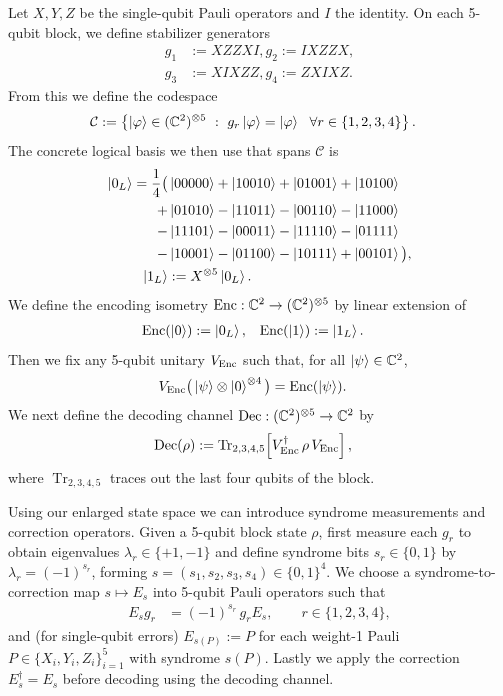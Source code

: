 Let $X,Y,Z$ be the single-qubit Pauli operators and $I$ the identity.
On each 5-qubit block, we define stabilizer generators
\begin{align}
g_1 &:= XZZXI, g_2 := IXZZX, \nonumber \\
g_3 &:= XIXZZ, g_4 := ZXIXZ.
\end{align}
From this we define the codespace
\begin{align}
\mathcal{C}
&:= \left\{\ket{\varphi}\in(\mathbb{C}^2)^{\otimes 5} ~:~ g_r\ket{\varphi}=\ket{\varphi}\ \ \forall r\in\{1,2,3,4\}\right\}.
\end{align}
The concrete logical basis we then use that spans $\mathcal{C}$ is
\begin{align}
\ket{0_L} = \frac{1}{4}\big(&\ket{00000}+\ket{10010}+\ket{01001}+\ket{10100} \nonumber \\
+&\ket{01010} -\ket{11011}-\ket{00110}-\ket{11000} \nonumber \\
-&\ket{11101}-\ket{00011}-\ket{11110}-\ket{01111} \nonumber \\
-&\ket{10001} -\ket{01100}-\ket{10111}+\ket{00101}\big),
\\
\ket{1_L}
&:= X^{\otimes 5}\ket{0_L}.
\end{align}
We define the encoding isometry $\operatorname{Enc}:\mathbb{C}^2\to(\mathbb{C}^2)^{\otimes 5}$ by linear extension of
\begin{align}
\operatorname{Enc}(\ket{0}) &:= \ket{0_L}, &
\operatorname{Enc}(\ket{1}) &:= \ket{1_L}.
\end{align}
Then we fix any 5-qubit unitary $V_{\operatorname{Enc}}$ such that, for all $\ket{\psi}\in\mathbb{C}^2$,
\begin{align}
V_{\operatorname{Enc}}\big(\ket{\psi}\otimes\ket{0}^{\otimes 4}\big)
&= \operatorname{Enc}(\ket{\psi}).
\end{align}
We next define the decoding channel $\operatorname{Dec}:(\mathbb{C}^2)^{\otimes 5}\to\mathbb{C}^2$ by
\begin{align}
\operatorname{Dec}(\rho)
&:= \operatorname{Tr}_{2,3,4,5}\!\left[V_{\operatorname{Enc}}^\dagger\,\rho\,V_{\operatorname{Enc}}\right],
\end{align}
where $\operatorname{Tr}_{2,3,4,5}$ traces out the last four qubits of the block.

Using our enlarged state space we can introduce syndrome measurements and correction operators. Given a 5-qubit block state $\rho$, first measure each $g_r$ to obtain eigenvalues $\lambda_r\in\{+1,-1\}$ and define
syndrome bits $s_r\in\{0,1\}$ by $\lambda_r=(-1)^{s_r}$, forming $s=(s_1,s_2,s_3,s_4)\in\{0,1\}^4$. We choose a syndrome-to-correction map $s\mapsto E_s$ into 5-qubit Pauli operators such that
\begin{align}
E_s g_r
&= (-1)^{s_r}\, g_r E_s,
\qquad r\in\{1,2,3,4\},
\end{align}
and (for single-qubit errors) $E_{s(P)}:=P$ for each weight-1 Pauli $P\in\{X_i,Y_i,Z_i\}_{i=1}^5$ with syndrome $s(P)$. Lastly we apply the correction $E_s^\dagger=E_s$ before decoding using the decoding channel.

